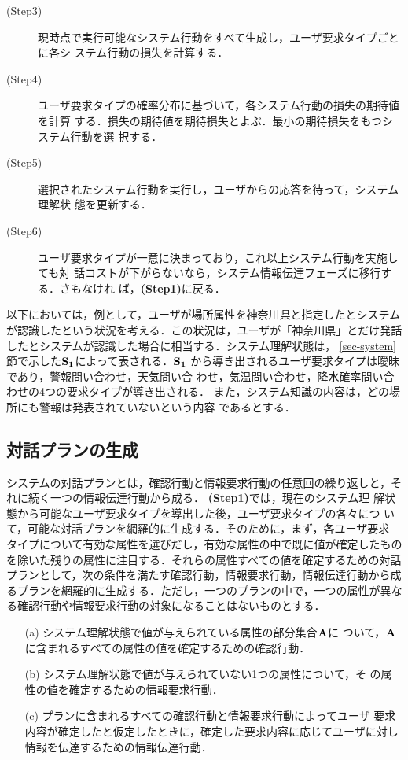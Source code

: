 \begin{description}
\item[(Step3)] 
現時点で実行可能なシステム行動をすべて生成し，ユーザ要求タイプごとに各シ
ステム行動の損失を計算する．

\item[(Step4)] 
ユーザ要求タイプの確率分布に基づいて，各システム行動の損失の期待値を計算
する．損失の期待値を期待損失とよぶ．最小の期待損失をもつシステム行動を選
択する．

\item[(Step5)] 
選択されたシステム行動を実行し，ユーザからの応答を待って，システム理解状
態を更新する．

\item[(Step6)] 
ユーザ要求タイプが一意に決まっており，これ以上システム行動を実施しても対
話コストが下がらないなら，システム情報伝達フェーズに移行する．さもなけれ
ば，{\bf (Step1)}に戻る．
\end{description}

以下においては，例として，ユーザが場所属性を神奈川県と指定したとシステム
が認識したという状況を考える．この状況は，ユーザが「神奈川県」とだけ発話
したとシステムが認識した場合に相当する．システム理解状態は，
\ref{sec-system}節で示した${\bf S_{1}}$によって表される．${\bf S_{1}}$ 
から導き出されるユーザ要求タイプは曖昧であり，警報問い合わせ，天気問い合
わせ，気温問い合わせ，降水確率問い合わせの4つの要求タイプが導き出される．
また，システム知識の内容は，どの場所にも警報は発表されていないという内容
であるとする．

\subsection{対話プランの生成}
\label{sec-plan}

システムの対話プランとは，確認行動と情報要求行動の任意回の繰り返しと，そ
れに続く一つの情報伝達行動から成る． {\bf (Step1)}では，現在のシステム理
解状態から可能なユーザ要求タイプを導出した後，ユーザ要求タイプの各々につ
いて，可能な対話プランを網羅的に生成する．そのために，まず，各ユーザ要求
タイプについて有効な属性を選びだし，有効な属性の中で既に値が確定したもの
を除いた残りの属性に注目する．それらの属性すべての値を確定するための対話
プランとして，次の条件を満たす確認行動，情報要求行動，情報伝達行動から成
るプランを網羅的に生成する．ただし，一つのプランの中で，一つの属性が異な
る確認行動や情報要求行動の対象になることはないものとする．

\begin{itemize}
\item[(a)] システム理解状態で値が与えられている属性の部分集合${\bf A}$に
ついて，${\bf A}$に含まれるすべての属性の値を確定するための確認行動．
\item[(b)] システム理解状態で値が与えられていない1つの属性について，そ
の属性の値を確定するための情報要求行動．
\item[(c)] プランに含まれるすべての確認行動と情報要求行動によってユーザ
要求内容が確定したと仮定したときに，確定した要求内容に応じてユーザに対し
情報を伝達するための情報伝達行動．
\end{itemize}

